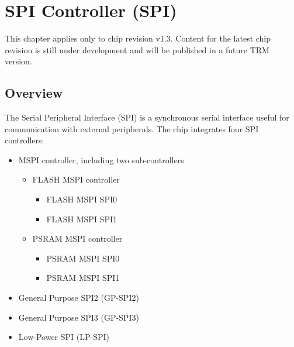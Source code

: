 \documentclass[main\_\_EN.tex]{subfiles}
\begin{document}

\ifglobal
\else
    \listoftodos
    {\let\clearpage\relax \listofdonetodos}
    \tableofcontents
    \listoftables
    \listoffigures
\fi


\hypertarget{spi}{}
\chapter{SPI Controller (SPI)}
\label{mod:spi}

\begin{tiplisting}
This chapter applies only to \chipname{} chip revision v1.3. Content for the latest chip revision is still under development and will be published in a future TRM version.
\end{tiplisting}

\section{Overview}

The Serial Peripheral Interface (SPI) is a synchronous serial interface useful for communication with external peripherals.
The \chipname{} chip integrates four SPI controllers:
\begin{itemize}
  \item MSPI controller, including two sub-controllers
  \begin{itemize}
      \item FLASH MSPI controller
      \begin{itemize}
          \item FLASH MSPI SPI0
          \item FLASH MSPI SPI1
        \end{itemize}
       \item PSRAM MSPI controller
        \begin{itemize}
          \item PSRAM MSPI SPI0
          \item PSRAM MSPI SPI1
        \end{itemize}
      \end{itemize}
  \item General Purpose SPI2 (GP-SPI2)
  \item General Purpose SPI3 (GP-SPI3)
  \item Low-Power SPI (LP-SPI)
\end{itemize}
\end{document}
